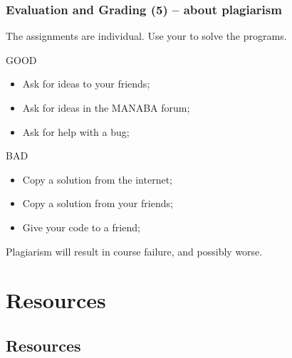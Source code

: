 \documentclass{beamer}
\begin{document}
\begin{frame}
  \frametitle{Evaluation and Grading (5) -- about plagiarism}
  
  The assignments are \alert{individual}. Use your  to solve the programs.

  \begin{exampleblock}{GOOD}
    \begin{itemize}
    \item Ask for ideas to your friends;
    \item Ask for ideas in the MANABA forum;
    \item Ask for help with a bug;
    \end{itemize}
  \end{exampleblock}

  \begin{alertblock}{BAD}
    \begin{itemize}
    \item Copy a solution from the internet;
    \item Copy a solution from your friends;
    \item Give your code to a friend;
    \end{itemize}
  \end{alertblock}

  Plagiarism will result in course failure, and possibly worse.
\end{frame}

\section{Resources}
\subsection{Resources}
\end{document}
